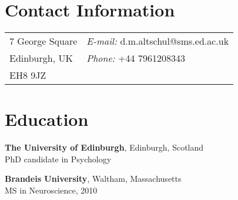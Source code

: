 \documentclass[margin,line]{res}
\newenvironment{list1}{
  \begin{list}{\ding{113}}{%
      \setlength{\itemsep}{0in}
      \setlength{\parsep}{0in} \setlength{\parskip}{0in}
      \setlength{\topsep}{0in} \setlength{\partopsep}{0in} 
      \setlength{\leftmargin}{0.17in}}}{\end{list}}
\begin{document}

\begin{resume}
\section{\sc Contact Information}
\vspace{.05in}
\begin{tabular}{@{}p{3in}p{4in}}
7 George Square  & {\it E-mail:}  d.m.altschul@sms.ed.ac.uk\\            
Edinburgh, UK & {\it Phone:} +44 7961208343 \\    
EH8 9JZ \\
\end{tabular}



\section{\sc Education}

{\bf The University of Edinburgh}, Edinburgh, Scotland\\
PhD candidate in Psychology
\vspace*{.05in}

{\bf Brandeis University}, Waltham, Massachusetts\\
MS in Neuroscience, 2010


\end{resume}
\end{document}
